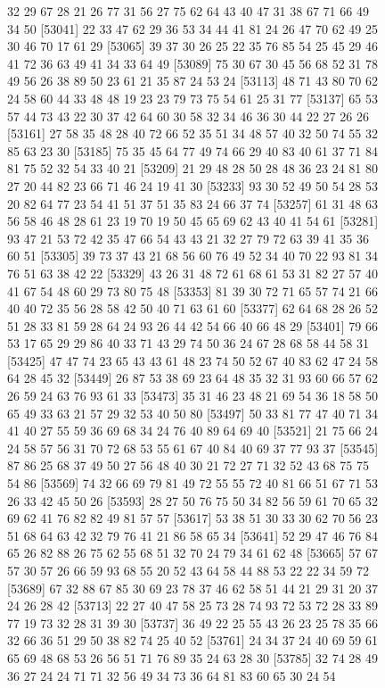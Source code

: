 \documentclass{article}
\begin{document}
\begin{figure}[H]
\begin{Schunk}
\begin{Soutput}
[53017] 32 29 67 28 21 26 77 31 56 27 75 62 64 43 40 47 31 38 67 71 66 49 34 50
[53041] 22 33 47 62 29 36 53 34 44 41 81 24 26 47 70 62 49 25 30 46 70 17 61 29
[53065] 39 37 30 26 25 22 35 76 85 54 25 45 29 46 41 72 36 63 49 41 34 33 64 49
[53089] 75 30 67 30 45 56 68 52 31 78 49 56 26 38 89 50 23 61 21 35 87 24 53 24
[53113] 48 71 43 80 70 62 24 58 60 44 33 48 48 19 23 23 79 73 75 54 61 25 31 77
[53137] 65 53 57 44 73 43 22 30 37 42 64 60 30 58 32 34 46 36 30 44 22 27 26 26
[53161] 27 58 35 48 28 40 72 66 52 35 51 34 48 57 40 32 50 74 55 32 85 63 23 30
[53185] 75 35 45 64 77 49 74 66 29 40 83 40 61 37 71 84 81 75 52 32 54 33 40 21
[53209] 21 29 48 28 50 28 48 36 23 24 81 80 27 20 44 82 23 66 71 46 24 19 41 30
[53233] 93 30 52 49 50 54 28 53 20 82 64 77 23 54 41 51 37 51 35 83 24 66 37 74
[53257] 61 31 48 63 56 58 46 48 28 61 23 19 70 19 50 45 65 69 62 43 40 41 54 61
[53281] 93 47 21 53 72 42 35 47 66 54 43 43 21 32 27 79 72 63 39 41 35 36 60 51
[53305] 39 73 37 43 21 68 56 60 76 49 52 34 40 70 22 93 81 34 76 51 63 38 42 22
[53329] 43 26 31 48 72 61 68 61 53 31 82 27 57 40 41 67 54 48 60 29 73 80 75 48
[53353] 81 39 30 72 71 65 57 74 21 66 40 40 72 35 56 28 58 42 50 40 71 63 61 60
[53377] 62 64 68 28 26 52 51 28 33 81 59 28 64 24 93 26 44 42 54 66 40 66 48 29
[53401] 79 66 53 17 65 29 29 86 40 33 71 43 29 74 50 36 24 67 28 68 58 44 58 31
[53425] 47 47 74 23 65 43 43 61 48 23 74 50 52 67 40 83 62 47 24 58 64 28 45 32
[53449] 26 87 53 38 69 23 64 48 35 32 31 93 60 66 57 62 26 59 24 63 76 93 61 33
[53473] 35 31 46 23 48 21 69 54 36 18 58 50 65 49 33 63 21 57 29 32 53 40 50 80
[53497] 50 33 81 77 47 40 71 34 41 40 27 55 59 36 69 68 34 24 76 40 89 64 69 40
[53521] 21 75 66 24 24 58 57 56 31 70 72 68 53 55 61 67 40 84 40 69 37 77 93 37
[53545] 87 86 25 68 37 49 50 27 56 48 40 30 21 72 27 71 32 52 43 68 75 75 54 86
[53569] 74 32 66 69 79 81 49 72 55 55 72 40 81 66 51 67 71 53 26 33 42 45 50 26
[53593] 28 27 50 76 75 50 34 82 56 59 61 70 65 32 69 62 41 76 82 82 49 81 57 57
[53617] 53 38 51 30 33 30 62 70 56 23 51 68 64 63 42 32 79 76 41 21 86 58 65 34
[53641] 52 29 47 46 76 84 65 26 82 88 26 75 62 55 68 51 32 70 24 79 34 61 62 48
[53665] 57 67 57 30 57 26 66 59 93 68 55 20 52 43 64 58 44 88 53 22 22 34 59 72
[53689] 67 32 88 67 85 30 69 23 78 37 46 62 58 51 44 21 29 31 20 37 24 26 28 42
[53713] 22 27 40 47 58 25 73 28 74 93 72 53 72 28 33 89 77 19 73 32 28 31 39 30
[53737] 36 49 22 25 55 43 26 23 25 78 35 66 32 66 36 51 29 50 38 82 74 25 40 52
[53761] 24 34 37 24 40 69 59 61 65 69 48 68 53 26 56 51 71 76 89 35 24 63 28 30
[53785] 32 74 28 49 36 27 24 24 71 71 32 56 49 34 73 36 64 81 83 60 65 30 24 54

\end{Soutput}
\end{Schunk}
\end{figure}
\end{document}

